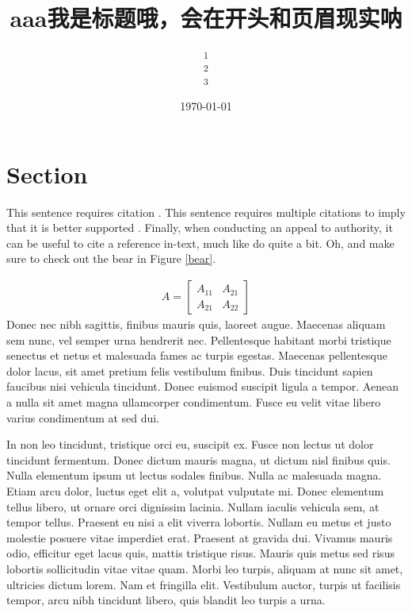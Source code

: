 \documentclass[10pt, a4paper, twocolumn, utf8]{article}
\title{aaa我是标题哦，会在开头和页眉现实呐}
\author{
	\authorstyle{
		张家铭\textsuperscript{1,2,3} 和 张晓灵\textsuperscript{2,3}
		}
	\newline\newline 
	\textsuperscript{1}\institution{北京林业大学, 北京, 中国}\\ 
	\textsuperscript{2}\institution{中国科学院大学，背景，中国}\\ 
	\textsuperscript{3}\institution{\texttt{LaTeXTemplates.com}} 
}
\date{\today}
\begin{document}
\maketitle %
\thispagestyle{firstpage} %



\section{Section}
   This sentence requires citation \citep{Reference1}. This sentence requires multiple citations to imply that it is better supported \citep{Reference2,Reference3}. Finally, when conducting an appeal to authority, it can be useful to cite a reference in-text, much like \cite{Reference1} do quite a bit. Oh, and make sure to check out the bear in Figure \ref{bear}.

\begin{align}
	A = 
	\begin{bmatrix}
		A_{11} & A_{21} \\
		A_{21} & A_{22}
	\end{bmatrix}
\end{align}
Donec nec nibh sagittis, finibus mauris quis, laoreet augue. Maecenas aliquam sem nunc, vel semper urna hendrerit nec. Pellentesque habitant morbi tristique senectus et netus et malesuada fames ac turpis egestas. Maecenas pellentesque dolor lacus, sit amet pretium felis vestibulum finibus. Duis tincidunt sapien faucibus nisi vehicula tincidunt. Donec euismod suscipit ligula a tempor. Aenean a nulla sit amet magna ullamcorper condimentum. Fusce eu velit vitae libero varius condimentum at sed dui.

In non leo tincidunt, tristique orci eu, suscipit ex. Fusce non lectus ut dolor tincidunt fermentum. Donec dictum mauris magna, ut dictum nisl finibus quis. Nulla elementum ipsum ut lectus sodales finibus. Nulla ac malesuada magna. Etiam arcu dolor, luctus eget elit a, volutpat vulputate mi. Donec elementum tellus libero, ut ornare orci dignissim lacinia. Nullam iaculis vehicula sem, at tempor tellus. Praesent eu nisi a elit viverra lobortis. Nullam eu metus et justo molestie posuere vitae imperdiet erat. Praesent at gravida dui. Vivamus mauris odio, efficitur eget lacus quis, mattis tristique risus. Mauris quis metus sed risus lobortis sollicitudin vitae vitae quam. Morbi leo turpis, aliquam at nunc sit amet, ultricies dictum lorem. Nam et fringilla elit. Vestibulum auctor, turpis ut facilisis tempor, arcu nibh tincidunt libero, quis blandit leo turpis a urna.
\end{document}
